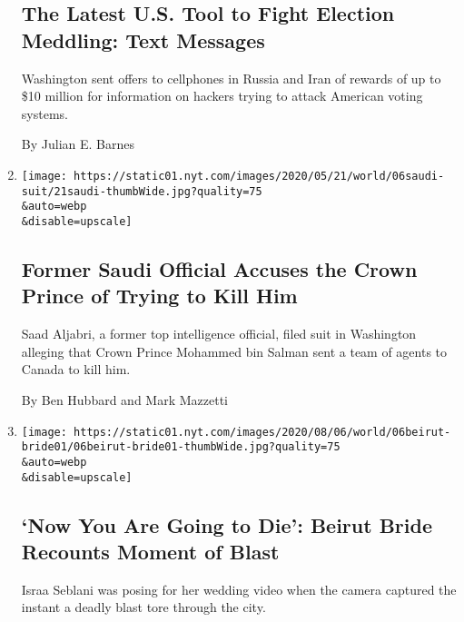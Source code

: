 \begin{enumerate}
  \hypertarget{the-latest-us-tool-to-fight-election-meddling-text-messages}{%
  \subsection{The Latest U.S. Tool to Fight Election Meddling: Text
  Messages}\label{the-latest-us-tool-to-fight-election-meddling-text-messages}}

  Washington sent offers to cellphones in Russia and Iran of rewards of
  up to \$10 million for information on hackers trying to attack
  American voting systems.

  By Julian E. Barnes
\item
  \href{/2020/08/06/world/middleeast/saudi-prince-mohammed-lawsuit-aljabri.html}{}

  \texttt{[image: https://static01.nyt.com/images/2020/05/21/world/06saudi-suit/21saudi-thumbWide.jpg?quality=75\\\&auto=webp\\\&disable=upscale]}

  \hypertarget{former-saudi-official-accuses-the-crown-prince-of-trying-to-kill-him}{%
  \subsection{Former Saudi Official Accuses the Crown Prince of Trying
  to Kill
  Him}\label{former-saudi-official-accuses-the-crown-prince-of-trying-to-kill-him}}

  Saad Aljabri, a former top intelligence official, filed suit in
  Washington alleging that Crown Prince Mohammed bin Salman sent a team
  of agents to Canada to kill him.

  By Ben Hubbard and Mark Mazzetti
\item
  \href{/2020/08/06/world/middleeast/beirut-explosion-bride-video.html}{}

  \texttt{[image: https://static01.nyt.com/images/2020/08/06/world/06beirut-bride01/06beirut-bride01-thumbWide.jpg?quality=75\\\&auto=webp\\\&disable=upscale]}

  \hypertarget{now-you-are-going-to-die-beirut-bride-recounts-moment-of-blast}{%
  \subsection{`Now You Are Going to Die': Beirut Bride Recounts Moment
  of
  Blast}\label{now-you-are-going-to-die-beirut-bride-recounts-moment-of-blast}}

  Israa Seblani was posing for her wedding video when the camera
  captured the instant a deadly blast tore through the city.


\end{enumerate}
